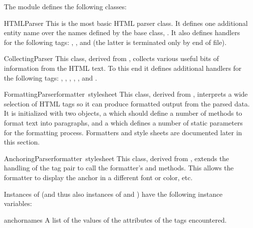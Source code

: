 The module defines the following classes:

\begin{funcdesc}{HTMLParser}{}
This is the most basic HTML parser class.  It defines one additional
entity name over the names defined by the  base
class, .  It also defines handlers for the following
tags: , , and
 (the latter is terminated only by end of file).
\end{funcdesc}

\begin{funcdesc}{CollectingParser}{}
This class, derived from , collects various useful
bits of information from the HTML text.  To this end it defines
additional handlers for the following tags: ,
, ,
, , and .
\end{funcdesc}

\begin{funcdesc}{FormattingParser}{formatter\, stylesheet}
This class, derived from , interprets a wide
selection of HTML tags so it can produce formatted output from the
parsed data.  It is initialized with two objects, a 
which should define a number of methods to format text into
paragraphs, and a  which defines a number of static
parameters for the formatting process.  Formatters and style sheets
are documented later in this section.
\end{funcdesc}

\begin{funcdesc}{AnchoringParser}{formatter\, stylesheet}
This class, derived from , extends the handling
of the  tag pair to call the formatter's
 and  methods.  This allows the
formatter to display the anchor in a different font or color, etc.
\end{funcdesc}

Instances of  (and thus also instances of
 and ) have the following
instance variables:

\begin{datadesc}{anchornames}
A list of the values of the  attributes of the 
tags encountered.
\end{datadesc}

